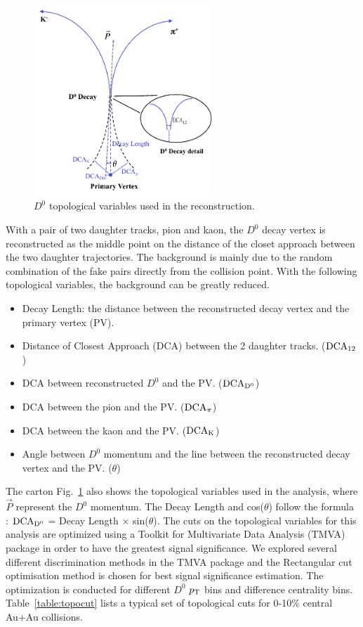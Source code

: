 \documentclass[%
 reprint,	
 amsmath,amssymb,
 aps,
 prc,
]{revtex4-1}
\begin{document}
\begin{figure}
\centering
\includegraphics[width=0.6\textwidth]{fig/D0carton.pdf}
\caption{$D^{0}$ topological variables used in the reconstruction.}
\label{fig:D0carton} 
\end{figure}

With a pair of two daughter tracks, pion and kaon, the $D^0$ decay vertex is reconstructed as the middle point on the distance of the closet approach between the two daughter trajectories. The background is mainly due to the random combination of the fake pairs directly from the collision point. With the following topological variables, the background can be greatly reduced.

\begin{itemize}
  \item Decay Length: the distance between the reconstructed decay vertex and the primary vertex (PV).
  \item Distance of Closest Approach (DCA) between the 2 daughter tracks. ($\rm DCA_{12}$)
  \item DCA between reconstructed $D^0$ and the PV. ($\rm DCA_{D^{0}}$)
  \item DCA between the pion and the PV. ($\rm DCA_{\pi}$)
  \item DCA between the kaon and the PV. ($\rm DCA_{K}$)
  \item Angle between $D^0$ momentum and the line between the reconstructed decay vertex and the PV. ($\theta$)
\end{itemize}

The carton Fig.~\ref{fig:D0carton} also shows the topological variables used in the analysis, where $\vec{P}$ represent the $D^0$ momentum. The Decay Length and cos($\theta$) follow the formula : $\rm DCA_{D^{0}}$ = Decay Length $\times$ sin($\theta$). The cuts on the topological variables for this analysis are optimized using a Toolkit for Multivariate Data Analysis (TMVA) package in order to have the greatest signal significance. We explored several different discrimination methods in the TMVA package and the Rectangular cut optimisation method is chosen for best signal significance estimation. The optimization is conducted for different $D^0$ $p_{\rm T}$ bins and difference centrality bins. Table~\ref{table:topocut} lists a typical set of topological cuts for 0-10\% central Au+Au collisions.
\end{document}
